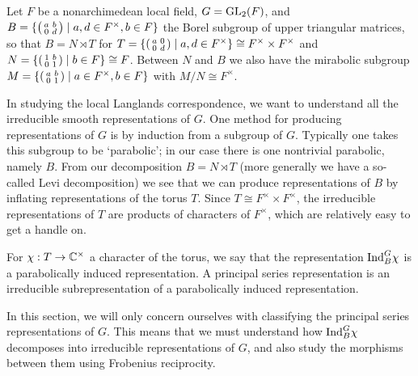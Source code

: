 

Let $F$ be a nonarchimedean local field, $G=\mathrm{GL}_2(F)$, and $B=\{\begin{psmallmatrix} a&b\\0&d\end{psmallmatrix} \mid a,d \in F^\times, b \in F\}$ the Borel subgroup of upper triangular matrices, so that $B=N \rtimes T$ for $T=\{\begin{psmallmatrix}
    a&0\\0&d
\end{psmallmatrix}\mid a,d \in F^\times\} \cong F^\times \times F^\times$ and $N=\{\begin{psmallmatrix}
    1&b\\0&1
\end{psmallmatrix}\mid b \in F\}\cong F$. Between $N$ and $B$ we also have the mirabolic subgroup $M=\{\begin{psmallmatrix}
    a&b\\0&1
\end{psmallmatrix} \mid a\in F^\times, b \in F\}$ with $M/N \cong F^\times$.

In studying the local Langlands correspondence, we want to understand all the irreducible smooth representations of $G$. One method for producing representations of $G$ is by induction from a subgroup of $G$. Typically one takes this subgroup to be `parabolic'; in our case there is one nontrivial parabolic, namely $B$. From our decomposition $B=N \rtimes T$ (more generally we have a so-called Levi decomposition) we see that we can produce representations of $B$ by inflating representations of the torus $T$. Since $T \cong F^\times \times F^\times$, the irreducible representations of $T$ are products of characters of $F^\times$, which are relatively easy to get a handle on.

\begin{defn}
    For $\chi:T \to \mathbb{C}^\times$ a character of the torus, we say that the representation $\mathrm{Ind}_B^G \chi$ is a parabolically induced representation. A principal series representation is an irreducible subrepresentation of a parabolically induced representation.
\end{defn}

In this section, we will only concern ourselves with classifying the principal series representations of $G$. This means that we must understand how $\mathrm{Ind}_B^G \chi$ decomposes into irreducible representations of $G$, and also study the morphisms between them using Frobenius reciprocity.

